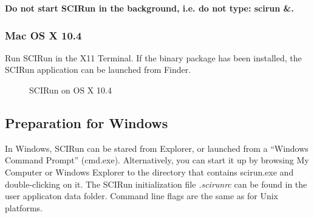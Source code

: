 \documentclass[fleqn,12pt,openany]{book}
\begin{document}
\begin{centering}
\textbf{\textsf{Do not start SCIRun in the background, i.e. do not type: scirun \&.}}
\end{centering}

\subsubsection{Mac OS X 10.4}

Run SCIRun in the X11 Terminal.
If the binary package has been installed, the SCIRun application can be launched from Finder.

\begin{figure}[H]
\begin{centering}
\caption{SCIRun on OS X 10.4}
\end{centering}
\end{figure}

\subsection{Preparation for Windows}

In Windows, SCIRun can be stared from Explorer, or launched from a
``Windows Command Prompt'' (cmd.exe).
Alternatively, you can start it up by browsing My Computer or Windows Explorer
to the directory that contains scirun.exe and double-clicking on it.
The SCIRun initialization file \emph{.scirunrc} can be found in the user applicaton data folder.
Command line flags are the same as for Unix platforms.
\end{document}
